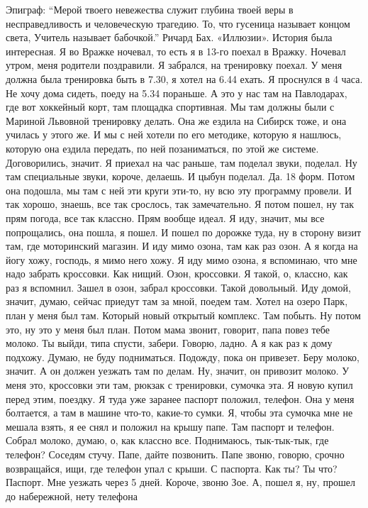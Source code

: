 Эпиграф: ``Мерой твоего невежества служит глубина твоей веры в несправедливость и человеческую трагедию. То, что гусеница называет концом света, Учитель называет бабочкой.'' Ричард Бах. «Иллюзии».
История была интересная. Я во Вражке ночевал, то есть я в 13-го поехал в Вражку.
Ночевал утром, меня родители поздравили. Я забрался, на тренировку поехал.
У меня должна была тренировка быть в 7.30, я хотел на 6.44 ехать. Я проснулся в 4 часа.
Не хочу дома сидеть, поеду на 5.34 пораньше. А это у нас там на
Павлодарах, где вот хоккейный корт, там площадка спортивная. Мы там должны были с
Мариной Львовной тренировку делать. Она же ездила на Сибирск тоже, и она училась у
этого же. И мы с ней хотели по его методике, которую я нашлюсь, которую она ездила
передать, по ней позаниматься, по этой же системе. Договорились, значит. Я приехал на час
раньше, там поделал звуки, поделал. Ну там специальные звуки, короче, делаешь. И цыбун поделал.
Да.
18 форм. Потом она подошла, мы там с ней эти круги эти-то, ну всю эту программу провели.
И так хорошо, знаешь, все так срослось, так замечательно. Я потом пошел, ну так прям
погода, все так классно. Прям вообще идеал. Я иду, значит, мы все попрощались, она пошла,
я пошел. И пошел по дорожке туда, ну в сторону визит там, где моторинский магазин. И иду мимо
озона, там как раз озон. А я когда на йогу хожу, господь, я мимо него хожу. Я иду мимо озона,
я вспоминаю, что мне надо забрать кроссовки. Как нищий. Озон, кроссовки. Я такой, о, классно,
как раз я вспомнил. Зашел в озон, забрал кроссовки. Такой довольный. Иду домой, значит, думаю,
сейчас приедут там за мной, поедем там. Хотел на озеро Парк, план у меня был там.
Который новый открытый комплекс. Там побыть. Ну потом это,
ну это у меня был план. Потом мама звонит, говорит, папа повез тебе молоко. Ты выйди,
типа спусти, забери. Говорю, ладно. А я как раз к дому подхожу. Думаю, не буду подниматься. Подожду,
пока он привезет. Беру молоко, значит. А он должен уезжать там по делам. Ну, значит,
он привозит молоко. У меня это, кроссовки эти там, рюкзак с тренировки, сумочка эта. Я новую
купил перед этим, поездку. Я туда уже заранее паспорт положил, телефон. Она у меня болтается,
а там в машине что-то, какие-то сумки. Я, чтобы эта сумочка мне не мешала взять, я ее снял и положил
на крышу папе. Там паспорт и телефон. Собрал молоко, думаю, о, как классно все. Поднимаюсь,
тык-тык-тык, где телефон? Соседям стучу. Папе, дайте позвонить. Папе звоню, говорю,
срочно возвращайся, ищи, где телефон упал с крыши. С паспорта. Как ты? Ты что? Паспорт.
Мне уезжать через 5 дней. Короче, звоню Зое. А, пошел я, ну, прошел до набережной, нету телефона
